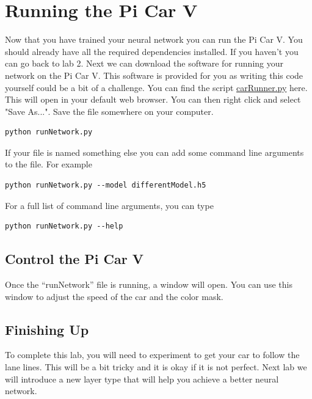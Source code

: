\documentclass[11pt]{report}
\begin{document}
\chapter{Running the Pi Car V} 
Now that you have trained your neural network you can run the Pi Car V. You should already have all the required dependencies installed. If you haven't you can go back to lab 2.
Next we can download the software for running your network on the Pi Car V. This software is provided for you as writing this code yourself could be a bit of a challenge. You can find the script 
\href{https://raw.githubusercontent.com/PiCarV/CarRunner/main/carRunner.py}{carRunner.py} here. This will open in your default web browser. You can then right click and select "Save As...". Save the file somewhere on your computer.
\begin{verbatim}
python runNetwork.py
\end{verbatim}
If your file is named something else you can add some command line arguments to the file. For example
\begin{verbatim}
python runNetwork.py --model differentModel.h5    
\end{verbatim}
For a full list of command line arguments, you can type 
\begin{verbatim}
python runNetwork.py --help
\end{verbatim}
\section{Control the Pi Car V}
Once the “runNetwork” file is running, a window will open. You can use this window to adjust the speed of the car and the color mask.

\section{Finishing Up}
To complete this lab, you will need to experiment to get your car to follow the lane lines. This will be a bit tricky and it is okay if it is not perfect. Next lab we will introduce a new layer type that will help you achieve a better neural network.
\end{document}
